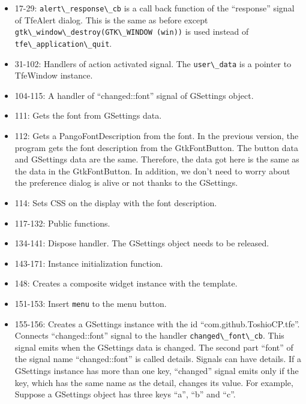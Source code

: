 \begin{itemize}
\tightlist
\item
  17-29: \passthrough{\lstinline!alert\_response\_cb!} is a call back
  function of the ``response'' signal of TfeAlert dialog. This is the
  same as before except
  \passthrough{\lstinline!gtk\_window\_destroy(GTK\_WINDOW (win))!} is
  used instead of \passthrough{\lstinline!tfe\_application\_quit!}.
\item
  31-102: Handlers of action activated signal. The
  \passthrough{\lstinline!user\_data!} is a pointer to TfeWindow
  instance.
\item
  104-115: A handler of ``changed::font'' signal of GSettings object.
\item
  111: Gets the font from GSettings data.
\item
  112: Gets a PangoFontDescription from the font. In the previous
  version, the program gets the font description from the GtkFontButton.
  The button data and GSettings data are the same. Therefore, the data
  got here is the same as the data in the GtkFontButton. In addition, we
  don't need to worry about the preference dialog is alive or not thanks
  to the GSettings.
\item
  114: Sets CSS on the display with the font description.
\item
  117-132: Public functions.
\item
  134-141: Dispose handler. The GSettings object needs to be released.
\item
  143-171: Instance initialization function.
\item
  148: Creates a composite widget instance with the template.
\item
  151-153: Insert \passthrough{\lstinline!menu!} to the menu button.
\item
  155-156: Creates a GSettings instance with the id
  ``com.github.ToshioCP.tfe''. Connects ``changed::font'' signal to the
  handler \passthrough{\lstinline!changed\_font\_cb!}. This signal emits
  when the GSettings data is changed. The second part ``font'' of the
  signal name ``changed::font'' is called details. Signals can have
  details. If a GSettings instance has more than one key, ``changed''
  signal emits only if the key, which has the same name as the detail,
  changes its value. For example, Suppose a GSettings object has three
  keys ``a'', ``b'' and ``c''.


\end{itemize}
